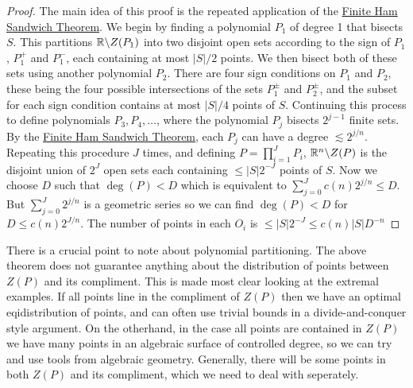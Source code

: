  \begin{proof}
 The main idea of this proof is the repeated application of the \hyperref[thm:FiniteHamSandwich]{Finite Ham Sandwich Theorem}. We begin by finding a polynomial $P_1$ of degree 1 that bisects $S$. This partitions $\mathbb R \backslash Z(P_1)$
 into two disjoint open sets according to the sign of $P_1$, $P_1^+$ and $P_1^-$, each containing at most $|S|/2$ points.
 We then bisect both of these sets using another polynomial $P_2$.
 There are four sign conditions on $P_1$ and $P_2$, these being the four possible intersections of the sets $P_1^{\pm}$ and $P_2^{\pm}$,
 and the subset for each sign condition contains at most $|S|/4$ points of $S$. 
 Continuing this process to define polynomials $P_3, P_4, \dots$, where the polynomial $P_j$ bisects $2^{j-1}$ finite sets. 
 By the \hyperref[thm:FiniteHamSandwich]{Finite Ham Sandwich Theorem}, each $P_j$ can have a degree
 $\lesssim 2^{j/n}$. 
 Repeating this procedure $J$ times, and defining $P = \prod_{i=1}^{J} P_i$, $\mathbb R^n \backslash Z(P)$ is the disjoint union of $2^J$ open sets each containing $ \leq |S|2^{-J}$
 points of $S$. Now we choose $D$ such that $\deg(P) < D$ which is equivalent to $\sum_{j=0}^J c(n) 2^{j/n} \leq D$. But $\sum_{j=0}^J 2^{j/n}$ is a geometric series so we can find $\deg (P) < D$ for $D \leq c(n) 2^{J/n}$. 
 The number of points in each $O_i$ is $\leq |S| 2^{-J} \leq c(n) |S| D^{-n}$
 \end{proof}

There is a crucial point to note about polynomial partitioning. 
The above theorem does not guarantee anything about the distribution of points between $Z(P)$ and its compliment.
This is made most clear looking at the extremal examples. If all points line in the compliment of $Z(P)$ then we have an optimal eqidistribution of points,
and can often use trivial bounds in a divide-and-conquer style argument. On the otherhand, in the case all points are contained in $Z(P)$ we have
many points in an algebraic surface of controlled degree, so we can try and use tools from algebraic geometry. Generally, there will be some points in both $Z(P)$ and its compliment,
which we need to deal with seperately.


